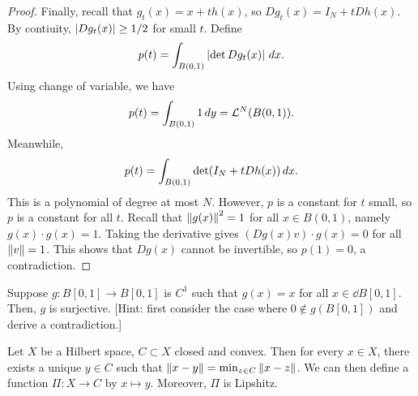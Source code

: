 \documentclass[a4paper]{article}
\begin{document}
\begin{proof}
  Finally, recall that $g_t(x) = x + t h(x)$, so $D g_t(x) = I_N + t
  Dh(x)$. By contiuity, $\left\lvert D g_t(x)\right\rvert \geq 1/2$ for small $t$. Define
  \[
    p(t) = \int_{B(0, 1)} \left\lvert \det Dg_t(x)\right\rvert \, d x.
  \]
  Using change of variable, we have
  \[
    p(t) = \int_{B(0, 1)}  1 \, d y = \mathcal{L}^N(B(0, 1)).
  \]
  Meanwhile,
  \[
    p(t) = \int_{B(0, 1)} \det (I_N + t Dh(x)) \, d x.
  \]
  This is a polynomial of degree at most $N$. However, $p$ is a constant
  for $t$ small, so $p$ is a constant for all $t$. Recall that
  $\left\lVert g(x)\right\rVert^2 = 1$ for all $x \in B(0, 1)$, namely $g(x) \cdot g(x) =
  1$. Taking the derivative gives $(Dg(x) v) \cdot g(x) = 0$ for all
  $\left\lVert v\right\rVert = 1$. This shows that $D g(x)$ cannot be invertible, so $p(1)
  = 0$, a contradiction.
\end{proof}

\begin{ex}
  Suppose $g : B[0, 1] \to B[0, 1]$ is $C^1$ such that $g(x) = x$ for all
  $x \in \dd B[0, 1]$. Then, $g$ is surjective. [Hint: first consider the
      case where $0 \notin g(B[0, 1])$ and derive a contradiction.]
\end{ex}

\begin{thm}
  Let $X$ be a Hilbert space, $C \subset X$ closed and convex. Then for
  every $x \in X$, there exists a unique $y \in C$ such that $\left\lVert x - y\right\rVert
    = \min_{z \in C} \left\lVert x - z\right\rVert$. We can then define a function $\Pi : X
    \to C$ by $x \mapsto y$. Moreover, $\Pi$ is Lipshitz.
\end{thm}
\end{document}
